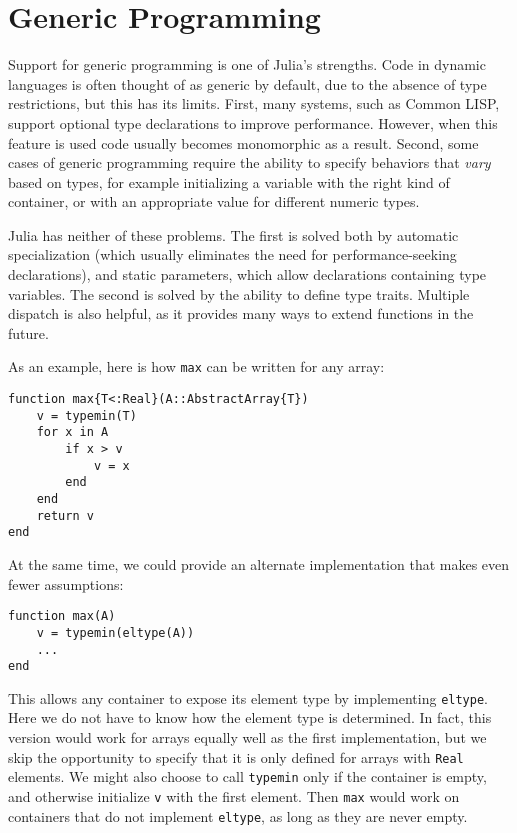 \section{Generic Programming}

Support for generic programming is one of Julia's strengths.
Code in dynamic languages is often thought of as generic by default, due
to the absence of type restrictions, but this has its limits. First, many
systems, such as Common LISP, support optional type declarations to
improve performance. However, when this feature is used code usually
becomes monomorphic as a result. Second, some cases of generic
programming require the ability to specify behaviors that \emph{vary}
based on types, for example initializing a variable with the right kind
of container, or with an appropriate value for different numeric types.

Julia has neither of these problems. The first is solved both by
automatic specialization (which usually eliminates the need for
performance-seeking declarations), and static parameters, which allow
declarations containing type variables. The second is solved by the
ability to define type traits. Multiple dispatch is also helpful, as it
provides many ways to extend functions in the future.

As an example, here is how {\tt max} can be written for any array:

\vspace{-0.2in}
\begin{singlespace}
\begin{verbatim}
function max{T<:Real}(A::AbstractArray{T})
    v = typemin(T)
    for x in A
        if x > v
            v = x
        end
    end
    return v
end
\end{verbatim}
\end{singlespace}

At the same time, we could provide an alternate implementation that makes
even fewer assumptions:

\vspace{-0.2in}
\begin{singlespace}
\begin{verbatim}
function max(A)
    v = typemin(eltype(A))
    ...
end
\end{verbatim}
\end{singlespace}

This allows any container to expose its element type by implementing
{\tt eltype}. Here we do not have to know how the element type is
determined. In fact, this version would work for arrays equally well
as the first implementation, but we skip the opportunity to specify
that it is only defined for arrays with {\tt Real} elements.
We might also choose to call {\tt typemin} only if the container is
empty, and otherwise initialize {\tt v} with the first element. Then
{\tt max} would work on containers that do not implement {\tt eltype},
as long as they are never empty.

